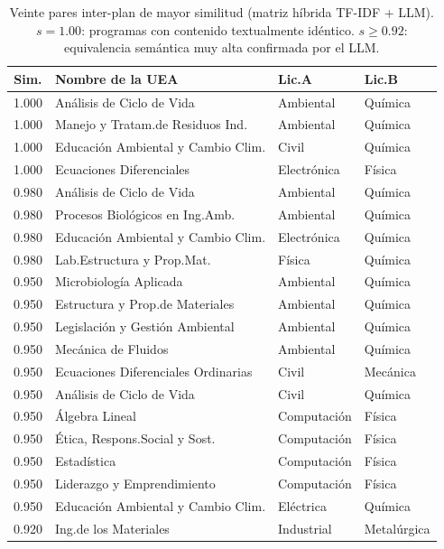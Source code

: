 \documentclass[11pt,a4paper]{article}
\begin{document}
\begin{table}[H]
\centering
\caption{Veinte pares inter-plan de mayor similitud (matriz híbrida TF-IDF + LLM).
  $s = 1.00$: programas con contenido textualmente idéntico.
  $s \geq 0.92$: equivalencia semántica muy alta confirmada por el LLM.}
\label{tab:inter}
\small\setlength{\tabcolsep}{4pt}
\begin{tabular}{clll}
\toprule
\textbf{Sim.} & \textbf{Nombre de la UEA} & \textbf{Lic.\@ A} & \textbf{Lic.\@ B} \\
\midrule
1.000 & Análisis de Ciclo de Vida           & Ambiental   & Química \\
1.000 & Manejo y Tratam.\@ de Residuos Ind. & Ambiental   & Química \\
1.000 & Educación Ambiental y Cambio Clim.  & Civil       & Química \\
1.000 & Ecuaciones Diferenciales            & Electrónica & Física  \\
0.980 & Análisis de Ciclo de Vida           & Ambiental   & Química \\
0.980 & Procesos Biológicos en Ing.\@ Amb.  & Ambiental   & Química \\
0.980 & Educación Ambiental y Cambio Clim.  & Electrónica & Química \\
0.980 & Lab.\@ Estructura y Prop.\@ Mat.    & Física      & Química \\
0.950 & Microbiología Aplicada              & Ambiental   & Química \\
0.950 & Estructura y Prop.\@ de Materiales  & Ambiental   & Química \\
0.950 & Legislación y Gestión Ambiental     & Ambiental   & Química \\
0.950 & Mecánica de Fluidos                 & Ambiental   & Química \\
0.950 & Ecuaciones Diferenciales Ordinarias & Civil       & Mecánica \\
0.950 & Análisis de Ciclo de Vida           & Civil       & Química \\
0.950 & Álgebra Lineal                      & Computación & Física  \\
0.950 & Ética, Respons.\@ Social y Sost.    & Computación & Física  \\
0.950 & Estadística                         & Computación & Física  \\
0.950 & Liderazgo y Emprendimiento          & Computación & Física  \\
0.950 & Educación Ambiental y Cambio Clim.  & Eléctrica   & Química \\
0.920 & Ing.\@ de los Materiales            & Industrial  & Metalúrgica \\
\bottomrule
\end{tabular}
\end{table}
\end{document}
